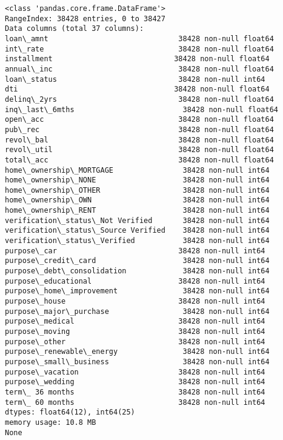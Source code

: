 \documentclass[11pt]{article}
\begin{document}
    \begin{Verbatim}[commandchars=\\\{\}]
<class 'pandas.core.frame.DataFrame'>
RangeIndex: 38428 entries, 0 to 38427
Data columns (total 37 columns):
loan\_amnt                              38428 non-null float64
int\_rate                               38428 non-null float64
installment                            38428 non-null float64
annual\_inc                             38428 non-null float64
loan\_status                            38428 non-null int64
dti                                    38428 non-null float64
delinq\_2yrs                            38428 non-null float64
inq\_last\_6mths                         38428 non-null float64
open\_acc                               38428 non-null float64
pub\_rec                                38428 non-null float64
revol\_bal                              38428 non-null float64
revol\_util                             38428 non-null float64
total\_acc                              38428 non-null float64
home\_ownership\_MORTGAGE                38428 non-null int64
home\_ownership\_NONE                    38428 non-null int64
home\_ownership\_OTHER                   38428 non-null int64
home\_ownership\_OWN                     38428 non-null int64
home\_ownership\_RENT                    38428 non-null int64
verification\_status\_Not Verified       38428 non-null int64
verification\_status\_Source Verified    38428 non-null int64
verification\_status\_Verified           38428 non-null int64
purpose\_car                            38428 non-null int64
purpose\_credit\_card                    38428 non-null int64
purpose\_debt\_consolidation             38428 non-null int64
purpose\_educational                    38428 non-null int64
purpose\_home\_improvement               38428 non-null int64
purpose\_house                          38428 non-null int64
purpose\_major\_purchase                 38428 non-null int64
purpose\_medical                        38428 non-null int64
purpose\_moving                         38428 non-null int64
purpose\_other                          38428 non-null int64
purpose\_renewable\_energy               38428 non-null int64
purpose\_small\_business                 38428 non-null int64
purpose\_vacation                       38428 non-null int64
purpose\_wedding                        38428 non-null int64
term\_ 36 months                        38428 non-null int64
term\_ 60 months                        38428 non-null int64
dtypes: float64(12), int64(25)
memory usage: 10.8 MB
None

    \end{Verbatim}
\end{document}
